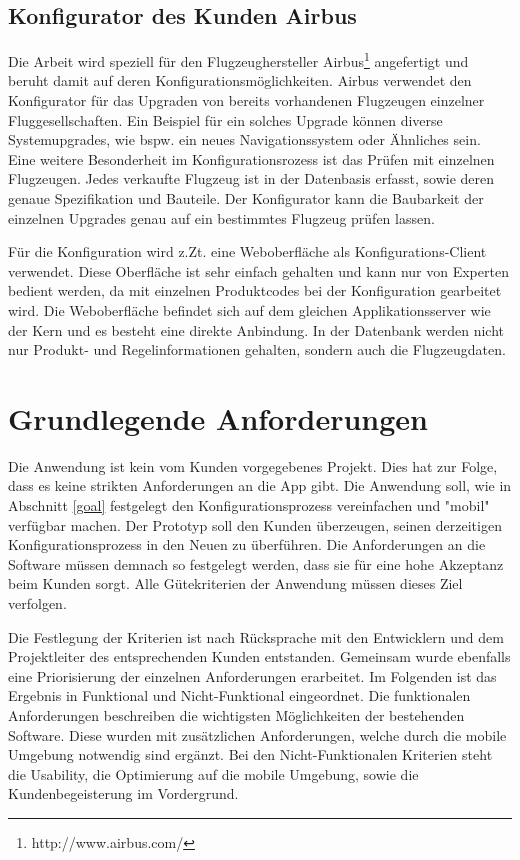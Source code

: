 \subsection{Konfigurator des Kunden Airbus}
Die Arbeit wird speziell für den Flugzeughersteller Airbus\footnote{http://www.airbus.com/} angefertigt und beruht damit auf deren Konfigurationsmöglichkeiten. Airbus verwendet den Konfigurator für das Upgraden von bereits vorhandenen Flugzeugen einzelner Fluggesellschaften. Ein Beispiel für ein solches Upgrade können diverse Systemupgrades, wie bspw. ein neues Navigationssystem oder Ähnliches sein. Eine weitere Besonderheit im Konfigurationsrozess ist das Prüfen mit einzelnen Flugzeugen. Jedes verkaufte Flugzeug ist in der Datenbasis erfasst, sowie deren genaue Spezifikation und Bauteile. Der Konfigurator kann die Baubarkeit der einzelnen Upgrades genau auf ein bestimmtes Flugzeug prüfen lassen. \par

Für die Konfiguration wird z.Zt. eine Weboberfläche als Konfigurations-Client verwendet. Diese Oberfläche ist sehr einfach gehalten und kann nur von Experten bedient werden, da mit einzelnen Produktcodes bei der Konfiguration gearbeitet wird. Die Weboberfläche befindet sich auf dem gleichen Applikationsserver wie der Kern und es besteht eine direkte Anbindung. In der Datenbank werden nicht nur Produkt- und Regelinformationen gehalten, sondern auch die Flugzeugdaten. 

  
\section{Grundlegende Anforderungen}
Die Anwendung ist kein vom Kunden vorgegebenes Projekt. Dies hat zur Folge, dass es keine strikten Anforderungen an die App gibt. Die Anwendung soll, wie in Abschnitt \ref{goal} festgelegt den Konfigurationsprozess vereinfachen und "mobil" verfügbar machen. Der Prototyp soll den Kunden überzeugen, seinen derzeitigen Konfigurationsprozess in den Neuen zu überführen. Die Anforderungen an die Software müssen demnach so festgelegt werden, dass sie für eine hohe Akzeptanz beim Kunden sorgt. Alle Gütekriterien der Anwendung müssen dieses Ziel verfolgen. \par

Die Festlegung der Kriterien ist nach Rücksprache mit den Entwicklern und dem Projektleiter des entsprechenden Kunden entstanden. Gemeinsam wurde ebenfalls eine Priorisierung der einzelnen Anforderungen erarbeitet. Im Folgenden ist das Ergebnis in Funktional und Nicht-Funktional eingeordnet. Die funktionalen Anforderungen beschreiben die wichtigsten Möglichkeiten der bestehenden Software. Diese wurden mit zusätzlichen Anforderungen, welche durch die mobile Umgebung notwendig sind ergänzt. Bei den Nicht-Funktionalen Kriterien steht die Usability, die Optimierung auf die mobile Umgebung, sowie die Kundenbegeisterung im Vordergrund. 

